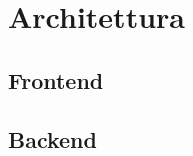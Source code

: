 \section{Architettura}\label{architettura}

\subsection{Frontend}\label{architetturaFront}

\subsection{Backend}\label{architetturaBack}